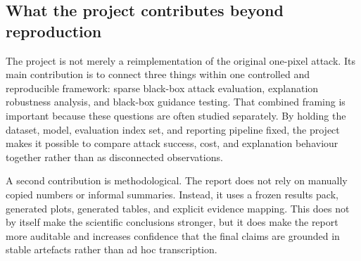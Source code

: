 \subsection{What the project contributes beyond reproduction}
The project is not merely a reimplementation of the original one-pixel attack.
Its main contribution is to connect three things within one controlled and reproducible framework: sparse black-box attack evaluation, explanation robustness analysis, and black-box guidance testing.
That combined framing is important because these questions are often studied separately.
By holding the dataset, model, evaluation index set, and reporting pipeline fixed, the project makes it possible to compare attack success, cost, and explanation behaviour together rather than as disconnected observations.

A second contribution is methodological.
The report does not rely on manually copied numbers or informal summaries.
Instead, it uses a frozen results pack, generated plots, generated tables, and explicit evidence mapping.
This does not by itself make the scientific conclusions stronger, but it does make the report more auditable and increases confidence that the final claims are grounded in stable artefacts rather than ad hoc transcription.
